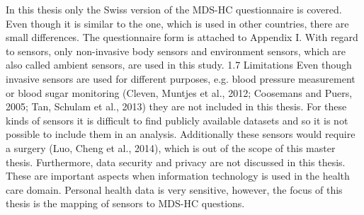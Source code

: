 In this thesis only the Swiss version of the MDS-HC questionnaire is covered. Even though it is similar to the one, which is used in other countries, there are small differences. The questionnaire form is attached to Appendix I.
With regard to sensors, only non-invasive body sensors and environment sensors, which are also called ambient sensors, are used in this study.
1.7 Limitations
Even though invasive sensors are used for different purposes, e.g. blood pressure measurement or blood sugar monitoring (Cleven, Muntjes et al., 2012; Coosemans and Puers, 2005; Tan, Schulam et al., 2013) they are not included in this thesis. For these kinds of sensors it is difficult to find publicly available datasets and so it is not possible to include them in an analysis. Additionally these sensors would require a surgery (Luo, Cheng et al., 2014), which is out of the scope of this master thesis.
Furthermore, data security and privacy are not discussed in this thesis. These are important aspects when information technology is used in the health care domain. Personal health data is very sensitive, however, the focus of this thesis is the mapping of sensors to MDS-HC questions.











